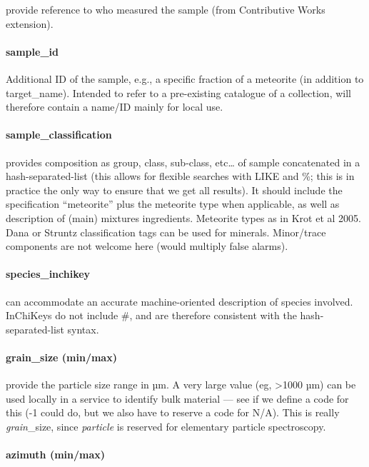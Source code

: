 \documentclass[11pt,a4paper]{ivoa}
\begin{document}
provide reference to who measured the sample
(from Contributive Works extension).

\paragraph{sample\_id}

Additional ID of the sample, e.g., a specific fraction of a meteorite
(in addition to target\_name).
Intended to refer to a pre-existing catalogue of a collection,
will therefore contain a name/ID mainly for local use.

\paragraph{sample\_classification}

provides composition as group, class, sub-class, etc… of sample
concatenated in a hash-separated-list (this allows for flexible searches
with LIKE and \%; this is in practice the only way to ensure that we
get all results). It should include the specification ``meteorite''
plus the meteorite type when applicable, as well as description of
(main) mixtures ingredients. Meteorite types as in Krot et al 2005. Dana
or Struntz classification tags can be used for minerals. Minor/trace
components are not welcome here (would multiply false alarms).

\paragraph{\textbf{species\_inchikey} }

can accommodate an accurate machine-oriented description of species
involved. InChiKeys do not include \#, and are therefore consistent
with the hash-separated-list syntax.

\paragraph{grain\_size (min/max)}

provide the particle size range in µm. A very large value (eg, >1000
µm) can be used locally in a service to identify bulk material --- see
if we define a code for this (-1 could do, but we also have to reserve a
code for N/A). This is really \emph{grain}\_size, since \emph{particle}
is reserved for elementary particle spectroscopy.

\paragraph{azimuth (min/max)}
\end{document}
